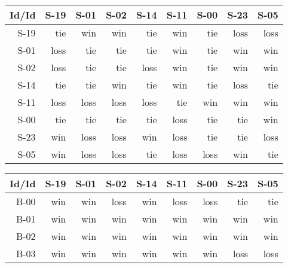 \begin{tabular}{ | r | r | r | r | r | r | r | r | r | }
    \hline
        Id/Id  &   S-19  &   S-01  &   S-02  &   S-14  &   S-11  &   S-00  &   S-23  &   S-05  \\
    \hline
    \hline
         S-19  &    tie  &    win  &    win  &    tie  &    win  &    tie  &   loss  &   loss  \\
    \hline
         S-01  &   loss  &    tie  &    tie  &    tie  &    win  &    tie  &    win  &    win  \\
    \hline
         S-02  &   loss  &    tie  &    tie  &   loss  &    win  &    tie  &    win  &    win  \\
    \hline
         S-14  &    tie  &    tie  &    win  &    tie  &    win  &    tie  &   loss  &    tie  \\
    \hline
         S-11  &   loss  &   loss  &   loss  &   loss  &    tie  &    win  &    win  &    win  \\
    \hline
         S-00  &    tie  &    tie  &    tie  &    tie  &   loss  &    tie  &    tie  &    win  \\
    \hline
         S-23  &    win  &   loss  &   loss  &    win  &   loss  &    tie  &    tie  &   loss  \\
    \hline
         S-05  &    win  &   loss  &   loss  &    tie  &   loss  &   loss  &    win  &    tie  \\
    \hline
\end{tabular}


\begin{tabular}{ | r | r | r | r | r | r | r | r | r | }
    \hline
        Id/Id  &   S-19  &   S-01  &   S-02  &   S-14  &   S-11  &   S-00  &   S-23  &   S-05  \\
    \hline
    \hline
         B-00  &    win  &    win  &   loss  &    win  &   loss  &   loss  &    tie  &    tie  \\
    \hline
         B-01  &    win  &    win  &    win  &    win  &    win  &    win  &    win  &    win  \\
    \hline
         B-02  &    win  &    win  &    win  &    win  &    win  &    win  &    win  &    win  \\
    \hline
         B-03  &    win  &    win  &    win  &    win  &    win  &    win  &   loss  &   loss  \\
    \hline
\end{tabular}




